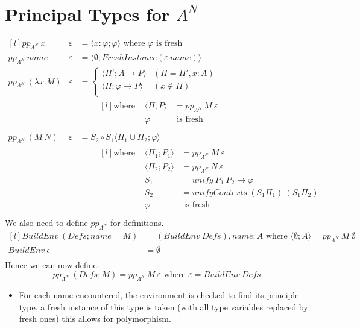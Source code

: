 \section{Principal Types for $\Lambda^N$}
\[\begin{matrix*}[l]
    pp_{\Lambda^N} \ x & \varepsilon & = \langle x: \varphi ; \varphi \rangle \text{ where } \varphi \text{ is fresh} \\
    pp_{\Lambda^N} \ name & \varepsilon & = \langle \emptyset ; FreshInstance(\varepsilon \ name) \rangle \\
    pp_{\Lambda^N} \ (\lambda x . M) & \varepsilon & = \begin{cases}
        \langle \Pi'; A \to P \rangle & (\Pi = \Pi', x:A) \\
        \langle \Pi; \varphi \to P \rangle & (x \not\in \Pi) \\
    \end{cases} \\
    & & \qquad \begin{matrix*}[l]
        \text{where } & \langle \Pi; P \rangle & = pp_{\Lambda^N} \ M \ \varepsilon \\
        & \varphi & \text{ is fresh} \\
    \end{matrix*} \\
    pp_{\Lambda^N} \ (M \ N) & \varepsilon & = S_2 \circ S_1 \langle \Pi_1 \cup \Pi_2 ; \varphi \rangle \\
    & & \qquad \begin{matrix*}[l]
        \text{where } & \langle \Pi_1 ; P_1 \rangle & = pp_{\Lambda^N} \ M \ \varepsilon \\
        & \langle \Pi_2 ; P_2 \rangle & = pp_{\Lambda^N} \ N \ \varepsilon \\
        & S_1 & = unify \ P_1 \ P_2 \to \varphi \\
        & S_2 & = unifyContexts \ (S_1 \Pi_1) \ (S_1 \Pi_2) \\
        & \varphi & \text{ is fresh} \\
    \end{matrix*}
\end{matrix*}\]
We also need to define $pp_{\Lambda^N}$ for definitions.
\[\begin{matrix*}[l]
    BuildEnv \ (Defs ; name = M) & = (BuildEnv \ Defs), name:A \text{ where } \langle \emptyset; A \rangle = pp_{\Lambda^N} \ M \ \emptyset \\
    BuildEnv \ \epsilon & = \emptyset \\
\end{matrix*}\]
Hence we can now define:
\[pp_{\Lambda^N} \ (Defs; M) = pp_{\Lambda^N} \ M \ \varepsilon \text{ where } \varepsilon = BuildEnv \ Defs\]
\begin{itemize}
    \item For each name encountered, the environment is checked to find its principle type, a fresh instance of this type is taken (with all type variables replaced by fresh ones) this allows for polymorphism.
\end{itemize}

